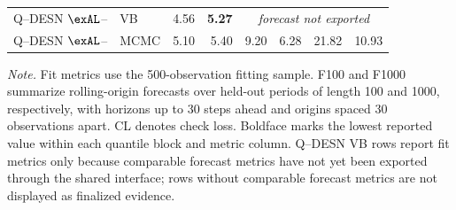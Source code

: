 \begin{table}[H]
\begin{tabular}{@{}llrrrrrr@{}}
Q--DESN \(\exAL\)--\RHS{} & VB & 4.56 & \textbf{5.27} & \multicolumn{4}{c}{\emph{forecast not exported}} \\
Q--DESN \(\exAL\)--\RHS{} & MCMC & 5.10 & 5.40 & 9.20 & 6.28 & 21.82 & 10.93 \\
\bottomrule
\end{tabular}
\par\vspace{0.35em}
\begin{minipage}{0.97\textwidth}\footnotesize
\emph{Note.} Fit metrics use the 500-observation fitting sample. F100 and F1000 summarize rolling-origin forecasts over held-out periods of length 100 and 1000, respectively, with horizons up to 30 steps ahead and origins spaced 30 observations apart. CL denotes check loss. Boldface marks the lowest reported value within each quantile block and metric column. Q--DESN VB rows report fit metrics only because comparable forecast metrics have not yet been exported through the shared interface; rows without comparable forecast metrics are not displayed as finalized evidence.
\end{minipage}
\end{table}
